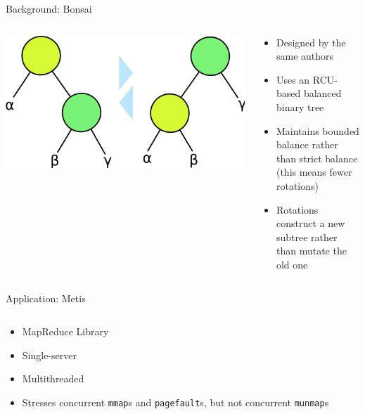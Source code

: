 \documentclass[aspectratio=169]{beamer}
\newcommand{\bi}{\begin{itemize}}
\newcommand{\ei}{\end{itemize}}
\begin{document}
\begin{frame}{Background: Bonsai}
  \begin{columns}[T]
    \begin{column}{0.6\textwidth}
      \begin{center}
        \includegraphics[scale=0.2]{./figures/Binary_tree_rotation.png}
      \end{center}
    \end{column}
    \begin{column}{0.4\textwidth}
      \bi
    \item Designed by the same authors
      \pause
    \item Uses an RCU-based balanced binary tree
      \pause
    \item Maintains bounded balance rather than strict balance\\
      (this means fewer rotations)
      \pause
    \item Rotations construct a new subtree rather than mutate the old one
      \ei
    \end{column}
  \end{columns}
\end{frame}

\begin{frame}{Application: Metis}
  \begin{columns}[T]
    \begin{column}{0.5\textwidth}
      \bi
    \item MapReduce Library
      \pause
    \item Single-server
      \pause
    \item Multithreaded
      \pause
    \item Stresses concurrent \texttt{mmap}s and \texttt{pagefault}s, but not concurrent \texttt{munmap}s
      \ei
    \end{column}
    \begin{column}{0.5\textwidth}
      \pause
      
    \end{column}
  \end{columns}
\end{frame}
\end{document}
